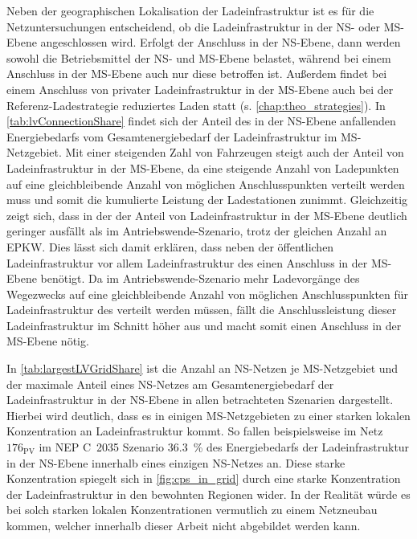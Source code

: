 Neben der geographischen Lokalisation der Ladeinfrastruktur ist es für die Netzuntersuchungen entscheidend, ob die Ladeinfrastruktur in der \gls{NS}- oder \gls{MS}-Ebene angeschlossen wird.
Erfolgt der Anschluss in der \gls{NS}-Ebene, dann werden sowohl die Betriebsmittel der \gls{NS}- und \gls{MS}-Ebene belastet, während bei einem Anschluss in der \gls{MS}-Ebene auch nur diese betroffen ist.
Außerdem findet bei einem Anschluss von privater Ladeinfrastruktur in der \gls{MS}-Ebene auch bei der Referenz-Ladestrategie reduziertes Laden statt (s. \autoref{chap:theo_strategies}).
In \autoref{tab:lvConnectionShare} findet sich der Anteil des in der \gls{NS}-Ebene anfallenden Energiebedarfs vom Gesamtenergiebedarf der Ladeinfrastruktur im \gls{MS}-Netzgebiet.
Mit einer steigenden Zahl von Fahrzeugen steigt auch der Anteil von Ladeinfrastruktur in der \gls{MS}-Ebene, da eine steigende Anzahl von Ladepunkten auf eine gleichbleibende Anzahl von möglichen Anschlusspunkten verteilt werden muss und somit die kumulierte Leistung der Ladestationen zunimmt.
Gleichzeitig zeigt sich, dass in der \SzeFirmenparkplatz der Anteil von Ladeinfrastruktur in der \gls{MS}-Ebene deutlich geringer ausfällt als im Antriebswende-Szenario, trotz der gleichen Anzahl an \gls{EPKW}.
Dies lässt sich damit erklären, dass neben der öffentlichen Ladeinfrastruktur vor allem Ladeinfrastruktur des \UC \Firmeparkplatz einen Anschluss in der \gls{MS}-Ebene benötigt.
Da im Antriebswende-Szenario mehr Ladevorgänge des Wegezwecks \Arbeit auf eine gleichbleibende Anzahl von möglichen Anschlusspunkten für Ladeinfrastruktur des \UC \Firmeparkplatz verteilt werden müssen, fällt die Anschlussleistung dieser Ladeinfrastruktur im Schnitt höher aus und macht somit einen Anschluss in der \gls{MS}-Ebene nötig.



In \autoref{tab:largestLVGridShare} ist die Anzahl an \gls{NS}-Netzen je \gls{MS}-Netzgebiet und der maximale Anteil eines \gls{NS}-Netzes am Gesamtenergiebedarf der Ladeinfrastruktur in der \gls{NS}-Ebene in allen betrachteten Szenarien dargestellt.
Hierbei wird deutlich, dass es in einigen \gls{MS}-Netzgebieten zu einer starken lokalen Konzentration an Ladeinfrastruktur kommt.
So fallen beispielsweise im Netz \(176_{\text{PV}}\) im \gls{NEP} C~\num{2035} Szenario \SI{36.3}{\percent} des Energiebedarfs der Ladeinfrastruktur in der \gls{NS}-Ebene innerhalb eines einzigen \gls{NS}-Netzes an.
Diese starke Konzentration spiegelt sich in \autoref{fig:cps_in_grid} durch eine starke Konzentration der Ladeinfrastruktur in den bewohnten Regionen wider.
In der Realität würde es bei solch starken lokalen Konzentrationen vermutlich zu einem Netzneubau kommen, welcher innerhalb dieser Arbeit nicht abgebildet werden kann.

